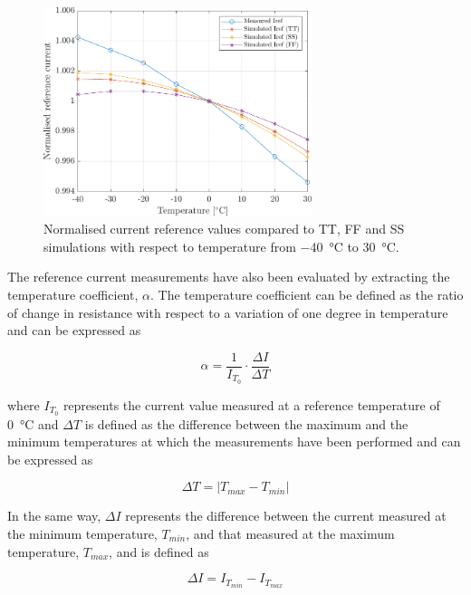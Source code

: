 \begin{figure}[h!]
    \centering
    \includegraphics[width=0.7\textwidth]{Images/chap1/results/BGR_current/BGR_current_normal_Iref.pdf}
    \caption{Normalised current reference values compared to TT, FF and SS simulations with respect to temperature from \SI{-40}{\celsius} to \SI{30}{\celsius}.}
    \label{figBGRplotsnormalised}
\end{figure}

\par
The reference current measurements have also been evaluated by extracting the temperature coefficient, $\alpha$. The temperature coefficient can be defined as the ratio of change in resistance with respect to a variation of one degree in temperature and can be expressed as

\begin{equation}
    \alpha = \frac{1}{I_{T_{0}}} \cdot \frac{\Delta I}{\Delta T}
\end{equation}

\noindent
where $I_{T_{0}}$ represents the current value measured at a reference temperature of \SI{0}{\celsius} and $\Delta T$ is defined as the difference between the maximum and the minimum temperatures at which the measurements have been performed and can be expressed as

\begin{equation}
    \Delta T = \lvert T_{max} - T_{min} \rvert
\end{equation}

\noindent
In the same way, $\Delta I$ represents the difference between the current measured at the minimum temperature, $T_{min}$, and that measured at the maximum temperature, $T_{max}$, and is defined as 

\begin{equation}
    \Delta I = I_{T_{min}}- I_{T_{max}}
\end{equation}

